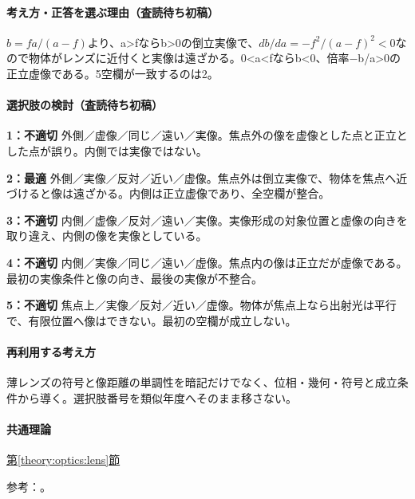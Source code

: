 \paragraph{考え方・正答を選ぶ理由（査読待ち初稿）} \(b=fa/(a-f)\)より、a>fならb>0の倒立実像で、\(db/da=-f^2/(a-f)^2<0\)なので物体がレンズに近付くと実像は遠ざかる。0<a<fならb<0、倍率−b/a>0の正立虚像である。5空欄が一致するのは2。

\paragraph{選択肢の検討（査読待ち初稿）}\mbox{}\par

\noindent\textbf{1：不適切} 外側／虚像／同じ／遠い／実像。焦点外の像を虚像とした点と正立とした点が誤り。内側では実像ではない。\par

\noindent\textbf{2：最適} 外側／実像／反対／近い／虚像。焦点外は倒立実像で、物体を焦点へ近づけると像は遠ざかる。内側は正立虚像であり、全空欄が整合。\par

\noindent\textbf{3：不適切} 内側／虚像／反対／遠い／実像。実像形成の対象位置と虚像の向きを取り違え、内側の像を実像としている。\par

\noindent\textbf{4：不適切} 内側／実像／同じ／遠い／虚像。焦点内の像は正立だが虚像である。最初の実像条件と像の向き、最後の実像が不整合。\par

\noindent\textbf{5：不適切} 焦点上／実像／反対／近い／虚像。物体が焦点上なら出射光は平行で、有限位置へ像はできない。最初の空欄が成立しない。\par

\paragraph{再利用する考え方} 薄レンズの符号と像距離の単調性を暗記だけでなく、位相・幾何・符号と成立条件から導く。選択肢番号を類似年度へそのまま移さない。

\paragraph{共通理論} \hyperref[theory:optics:lens]{第\ref*{theory:optics:lens}節}

\par 参考：\cite{os_lens}。

